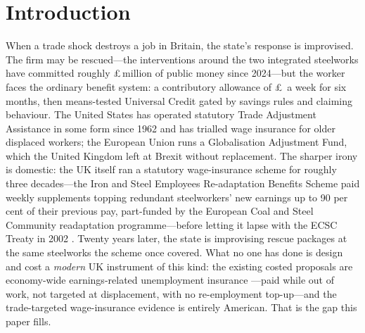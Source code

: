 \section{Introduction}\label{sec:intro}

When a trade shock destroys a job in Britain, the state's response is
improvised. The firm may be rescued---the interventions around the two
integrated steelworks have committed roughly
\pounds\InstAdHocSteelTotal\,million of public money since
2024---but the worker faces the ordinary benefit system: a contributory
allowance of \pounds\TaaJsaWeekly\ a week for six months, then
means-tested Universal Credit gated by savings rules and claiming
behaviour. The United States has operated statutory Trade Adjustment
Assistance in some form since 1962 and has trialled wage insurance for
older displaced workers; the European Union runs a Globalisation
Adjustment Fund, which the United Kingdom left at Brexit without
replacement. The sharper irony is domestic: the UK itself ran a statutory
wage-insurance scheme for roughly three decades---the Iron and Steel
Employees Re-adaptation Benefits Scheme paid weekly supplements topping
redundant steelworkers' new earnings up to 90 per cent of their previous
pay, part-funded by the European Coal and Steel Community readaptation
programme---before letting
it lapse with the ECSC Treaty in 2002 \citep{iserbs1988}. Twenty years
later, the state is improvising rescue packages at the same steelworks the
scheme once covered. What no one has done is design and cost a
\emph{modern} UK instrument of this kind: the existing costed proposals
are economy-wide earnings-related unemployment insurance
\citep{resolutionfoundation2023, ifs2025ui, ippr2011}---paid while out of
work, not targeted at displacement, with no re-employment top-up---and
the trade-targeted wage-insurance evidence is entirely American. That is
the gap this paper fills.

